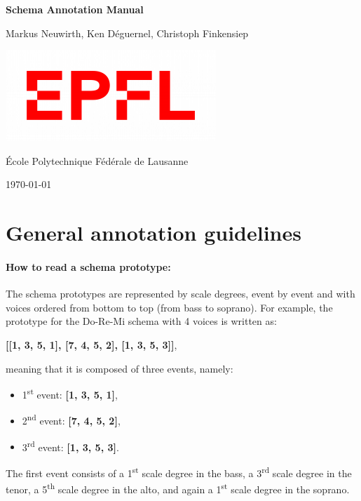 ﻿\documentclass[11pt, openany]{article}
\begin{document}
\begin{titlepage}
	\clearpage\thispagestyle{empty}
	\centering
	
	\vspace*{3cm}
	{\Huge \textbf{Schema Annotation Manual}} \\
	\vspace{1cm}
	{\normalsize Markus Neuwirth, %
	             Ken D\'eguernel,
	             Christoph Finkensiep\par}
	\vspace{10cm}

    \includegraphics[scale=0.6]{EPFL_logo.png}
    
    
	{\normalsize \'Ecole Polytechnique F\'ed\'erale de Lausanne \par}
		
	{\normalsize \today \par}
	\vspace{2cm}
	
	\pagebreak
\end{titlepage}

\tableofcontents{}
\pagebreak


\section{General annotation guidelines}

\paragraph{How to read a schema prototype:\\}
The schema prototypes are represented by scale degrees, event by event and with voices ordered from bottom to top (from bass to soprano). For example, the prototype for the Do-Re-Mi schema with 4 voices is written as:
\begin{center}
\textbf{[[1, 3, 5, 1], [7, 4, 5, 2], [1, 3, 5, 3]]},
\end{center}
meaning that it is composed of three events, namely:
\begin{itemize}
\item 1\textsuperscript{st} event: \textbf{[1, 3, 5, 1]},
\item 2\textsuperscript{nd} event:\textbf{ [7, 4, 5, 2]},
\item 3\textsuperscript{rd} event: \textbf{[1, 3, 5, 3]}.
\end{itemize}
The first event consists of a 1\textsuperscript{st} scale degree in the bass, a 3\textsuperscript{rd} scale degree in the tenor, a 5\textsuperscript{th} scale degree in the alto, and again a 1\textsuperscript{st} scale degree in the soprano.\\
\end{document}
